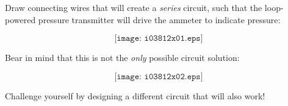 

Draw connecting wires that will create a {\it series} circuit, such that the loop-powered pressure transmitter will drive the ammeter to indicate pressure:

$$\texttt{[image: i03812x01.eps]}$$







Bear in mind that this is not the {\it only} possible circuit solution:

$$\texttt{[image: i03812x02.eps]}$$

Challenge yourself by designing a different circuit that will also work! 










